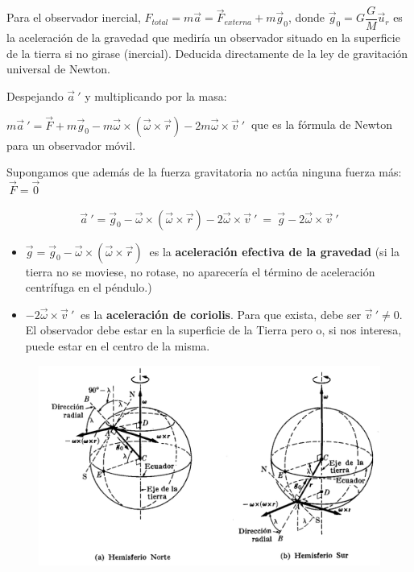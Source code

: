 Para el observador inercial, $F_{total}=m\vec a= \vec F_{externa}+m\vec g_0$, donde $\vec g_0= G\dfrac G M \vec u_r$ es la aceleración de la gravedad que mediría un observador situado en la superficie de la tierra si no girase (inercial). \textcolor{gris}{Deducida directamente de la ley de gravitación universal de Newton.}

Despejando $\vec a\ '$ y multiplicando por la masa:

$m\vec a\ '=\vec F + m\vec g_0-m\vec \omega \times (\vec \omega \times \vec r)-2m\vec \omega \times \vec v \ '\ $ que es la fórmula de Newton para un observador móvil.

Supongamos que además de la fuerza gravitatoria no actúa ninguna fuerza más: $\ \vec F = \vec 0$

$$\vec a\ '= \vec g_0- \vec \omega \times (\vec \omega \times \vec r)-2\vec \omega \times \vec v \ ' \ = \ \vec g -2\vec \omega \times \vec v\ '$$

\begin{itemize}
\item $\vec g =\vec g_0- \vec \omega \times (\vec \omega \times \vec r) \ $ es la \textbf{aceleración efectiva de la gravedad} (si la tierra no se moviese, no rotase, no aparecería el término de aceleración centrífuga en el péndulo.)
\item $-2\vec \omega \times \vec v\ ' \ $ es la \textbf{aceleración de coriolis}. Para que exista, debe ser $\vec v\ ' \neq 0$. El observador debe estar en la superficie de la Tierra pero o, si nos interesa, puede estar en el centro de la misma.
\end{itemize}

\begin{figure}[H]
	\centering
	\includegraphics[width=.95\textwidth]{imagenes/imagenes11/T11IM01.png}
\end{figure}

